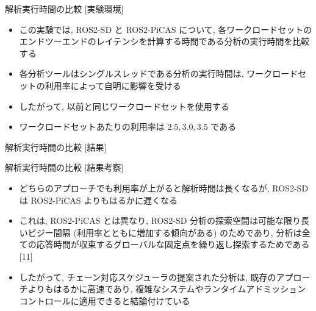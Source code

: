 \begin{frame}{解析実行時間の比較 [実験環境]}
    \begin{itemize}
        \item この実験では, ROS2-SD と ROS2-PiCAS について, 各ワークロードセットのエンドツーエンドのレイテンシを計算する時間である分析の実行時間を比較する
        \item 各分析ツールはシングルスレッドである分析の実行時間は, ワークロードセットの利用率によって自明に影響を受ける
        \item したがって, 以前と同じワークロードセットを使用する
        \item ワークロードセットあたりの利用率は $2.5, 3.0, 3.5$ である
    \end{itemize}
\end{frame}

\begin{frame}{解析実行時間の比較 [結果]}
\end{frame}

\begin{frame}{解析実行時間の比較 [結果考察]}
    \begin{itemize}
        \item どちらのアプローチでも利用率が上がると解析時間は長くなるが, ROS2-SD は ROS2-PiCAS よりもはるかに遅くなる
        \item これは, ROS2-PiCAS とは異なり, ROS2-SD 分析の探索空間は可能な限り長いビジー間隔 (利用率とともに増加する傾向がある) のためであり, 分析は全ての応答時間が収束するグローバルな固定点を繰り返し探索するためである [11]
        \item したがって, チェーン対応スケジューラの提案された分析は, 既存のアプローチよりもはるかに高速であり, 複雑なシステムやランタイムアドミッションコントロールに適用できると結論付けている
    \end{itemize}
\end{frame}

